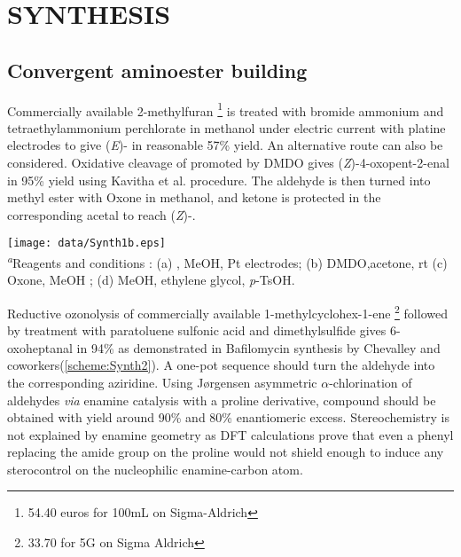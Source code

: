 \section*{SYNTHESIS}
\subsection*{Convergent aminoester building}
Commercially available 2-methylfuran \footnote{54.40 euros for 100mL on Sigma-Aldrich} is treated with bromide ammonium and tetraethylammonium perchlorate in methanol under electric current with platine electrodes to give (\textit{E})- in reasonable 57\% yield\autocites{Warriner07,Torii86}. An alternative route can also be considered. Oxidative cleavage of  promoted by DMDO gives (\textit{Z})-4-oxopent-2-enal  in 95\% yield using Kavitha et al. procedure\autocite{Kavitha07}. The aldehyde is then turned into methyl ester  with Oxone in methanol\autocite{Borhan03}, and ketone is protected in the corresponding acetal to reach (\textit{Z})-.
\begin{figure''}
\centering
		\texttt{[image: data/Synth1b.eps]}	
    \label{scheme:Synth1} 
     \\
 \justify 
 \textsf{\scriptsize{\textsuperscript{\textit{a}}Reagents and conditions : (a) , MeOH, Pt electrodes; (b) DMDO,acetone, rt (c) Oxone, MeOH ; (d) MeOH, ethylene glycol, \textit{p}-TsOH.}}
\end{figure''}
 Reductive ozonolysis of commercially available 1-methylcyclohex-1-ene \footnote{33.70  for 5G on Sigma Aldrich} followed by treatment with paratoluene sulfonic acid and dimethylsulfide gives 6-oxoheptanal  in 94\% as demonstrated in Bafilomycin synthesis by Chevalley and coworkers\autocite{Chevalley13}(\ref{scheme:Synth2}).
A one-pot sequence should turn the aldehyde into the corresponding aziridine\autocite{Pellissier14}. Using J\o{}rgensen asymmetric $\alpha$-chlorination of aldehydes\autocite{Jorgensen04} \textit{via} enamine catalysis with a proline derivative, compound  should be obtained with yield around 90\%  and 80\% enantiomeric excess. Stereochemistry is not explained by enamine geometry as DFT calculations prove that even a phenyl replacing the amide group on the proline would not shield enough to induce any sterocontrol on the nucleophilic enamine-carbon atom\autocite{Jorgensen05}.\\
